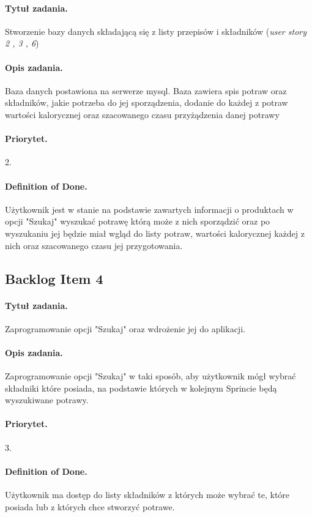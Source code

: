 \documentclass[a4paper]{article}
\begin{document}
\paragraph{Tytuł zadania.} Stworzenie bazy danych składającą się z listy przepisów i składników (\textit{user story 2 , 3 , 6})
\paragraph{Opis zadania.} Baza danych postawiona na serwerze mysql. Baza zawiera spis potraw oraz składników, jakie potrzeba do jej sporządzenia, dodanie do każdej z potraw wartości kalorycznej oraz szacowanego czasu przyżądzenia danej potrawy
\paragraph{Priorytet.} 2.
\paragraph{Definition of Done.} Użytkownik jest w stanie na podstawie zawartych informacji o produktach w opcji "Szukaj" wyszukać potrawę którą może z nich sporządzić oraz po wyszukaniu jej będzie miał wgląd do listy potraw, wartości kalorycznej każdej z nich oraz szacowanego czasu jej przygotowania.

\subsection{Backlog Item 4}
\paragraph{Tytuł zadania.} Zaprogramowanie opcji "Szukaj" oraz wdrożenie jej do aplikacji.
\paragraph{Opis zadania.} Zaprogramowanie opcji "Szukaj" w taki sposób, aby użytkownik mógł wybrać składniki które posiada, na podstawie których w kolejnym Sprincie będą wyszukiwane potrawy.
\paragraph{Priorytet.} 3.
\paragraph{Definition of Done.} Użytkownik ma dostęp do listy składników z których może wybrać te, które posiada lub z których chce stworzyć potrawe.
\end{document}
